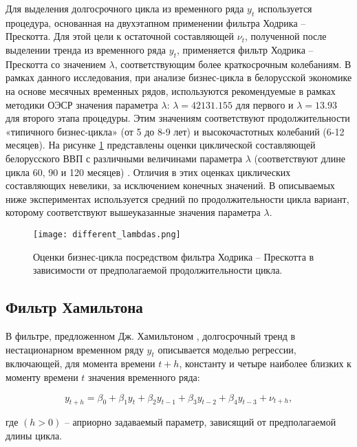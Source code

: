 \documentclass[a4paper,14pt]{extreport}
\begin{document}
	Для выделения долгосрочного цикла из временного ряда $y_t$ используется процедура, основанная на двухэтапном применении фильтра Ходрика -- Прескотта. Для этой цели к остаточной составляющей $\nu_t$, полученной после выделении тренда из временного ряда $y_t$, применяется фильтр Ходрика -- Прескотта со значением $\lambda$, соответствующим более краткосрочным колебаниям. В рамках данного исследования, при анализе бизнес-цикла в белорусской экономике на основе месячных временных рядов,  используются рекомендуемые в рамках методики ОЭСР значения параметра $\lambda$:  $\lambda = 42131.155$ для первого и $\lambda = 13.93$ для второго этапа процедуры. Этим значениям соответствуют продолжительности «типичного бизнес-цикла» (от 5 до 8-9 лет) и высокочастотных колебаний (6-12 месяцев). На рисунке \ref{fig:different_lambda} представлены оценки циклической составляющей белорусского ВВП с различными величинами параметра $\lambda$ (соответствуют длине цикла 60, 90 и 120 месяцев) \cite{esiMakingAlt}. Отличия в этих оценках циклических составляющих невелики, за исключением конечных значений.  В описываемых ниже экспериментах используется средний по продолжительности цикла вариант, которому соответствуют вышеуказанные значения параметра $\lambda$.
	
	\begin{figure}
		\texttt{[image: different\_lambdas.png]}
		\caption{Оценки бизнес-цикла посредством фильтра Ходрика -- Прескотта в зависимости от предполагаемой продолжительности цикла.}
		\label{fig:different_lambda}
	\end{figure} 	
	
	\subsection{Фильтр Хамильтона}
	
	В фильтре, предложенном Дж. Хамильтоном \cite{hamHP}, долгосрочный тренд в нестационарном временном ряду $y_t$ описывается моделью регрессии, включающей, для момента времени $t+h$, константу и четыре наиболее близких к моменту времени $t$ значения временного ряда: 
	
	\begin{equation}
		y_{t+h} = \beta_0 + \beta_1 y_t + \beta_2 y_{t-1} 
		+ \beta_3 y_{t-2} + \beta_4 y_{t-3} + \nu_{t+h} ,
		\label{eq:ham_filter}
	\end{equation}
	
	где $(h>0)$ -- априорно задаваемый параметр, зависящий от предполагаемой длины цикла. 
	
\end{document}
